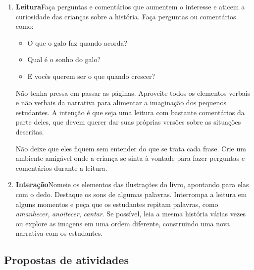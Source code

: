 \documentclass[11pt]{extarticle}
\begin{document}
\begin{enumerate}
\item \textbf{Leitura}\quad Faça perguntas e comentários que aumentem o 
interesse e aticem a curiosidade das crianças sobre a história. Faça 
perguntas ou comentários como: 

\begin{itemize}
\item O que o galo faz quando acorda?
\item Qual é o sonho do galo?
\item E vocês querem ser o que quando crescer?
\end{itemize}



Não tenha pressa em passar as páginas. Aproveite todos
os elementos verbais e não verbais da narrativa
para alimentar a imaginação dos pequenos estudantes. 
A intenção é que seja uma leitura com bastante comentários
da parte deles, que devem querer dar suas próprias versões
sobre as situações descritas.

Não deixe que eles fiquem sem entender do que se trata cada frase. Crie 
um ambiente amigável onde a criança se sinta à vontade para fazer 
perguntas e comentários durante a leitura.


\item \textbf{Interação}\quad Nomeie os elementos das ilustrações 
do livro, apontando para elas com o dedo. Destaque os sons de algumas 
palavras. Interrompa a leitura em alguns momentos e peça que 
os estudantes repitam palavras, como \textit{amanhecer}, \textit{anoitecer}, \textit{cantar}. Se possível, 
leia a mesma história várias vezes ou explore as imagens em uma ordem 
diferente, construindo uma nova narrativa com os estudantes. 
\end{enumerate}


\subsection{Propostas de atividades}

\end{document}
